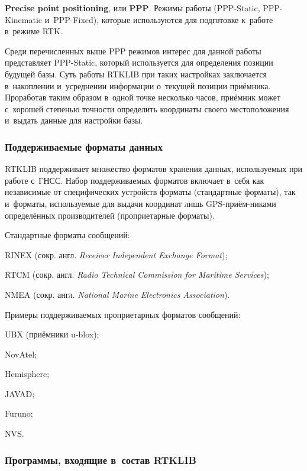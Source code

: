 \begin{dashitemize}
  \item \textbf{Precise point positioning}, или \textbf{PPP}. Режимы работы (PPP-Static, PPP-Kinematic и~PPP-Fixed), которые используются для подготовке к~работе в~режиме RTK. \par
  Среди перечисленных выше PPP режимов интерес для данной работы представляет PPP-Static, который используется для определения позиции будущей базы. Суть работы RTKLIB при таких настройках заключается в~накоплении и~усреднении информации о~текущей позиции приёмника. Проработав таким образом в~одной точке несколько часов, приёмник может с~хорошей степенью точности определить координаты своего местоположения и~выдать данные для настройки базы.
\end{dashitemize}

\subsubsection{Поддерживаемые форматы данных}

RTKLIB поддерживает множество форматов хранения данных, используемых при работе с~ГНСС. Набор поддерживаемых форматов включает в~себя как независимые от специфических устройств форматы (стандартные форматы), так и~форматы, используемые для выдачи координат лишь GPS-приём-никами определённых производителей (проприетарные форматы). \par

Стандартные форматы сообщений:
\begin{dashitemize}
  \item RINEX (сокр. англ. \emph{Receiver Independent Exchange Format});
  \item RTCM (сокр. англ. \emph{Radio Technical Commission for Maritime Services});
  \item NMEA (сокр. англ. \emph{National Marine Electronics Association}).
\end{dashitemize}

Примеры поддерживаемых проприетарных форматов сообщений:
\begin{dashitemize}
  \item UBX (приёмники u-blox);
  \item NovAtel;
  \item Hemisphere;
  \item JAVAD;
  \item Furuno;
  \item NVS.
\end{dashitemize}

\subsubsection{Программы, входящие в~состав RTKLIB}

